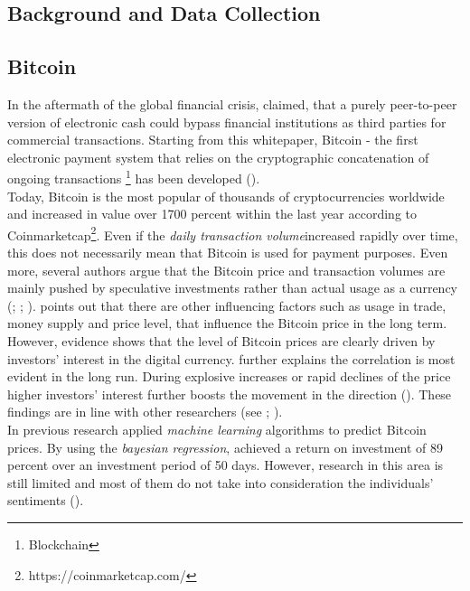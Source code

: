 \documentclass[a4paper,american,12pt]{article}
\begin{document}
\begin{spacing}{1.2}
\clearpage

\section{Background and Data Collection}
\label{sec:Background}
\subsection{Bitcoin}
In the aftermath of the global financial crisis, \textcite[p.~1]{Nakamoto2008Bitcoin} claimed, that a purely peer-to-peer version of electronic cash could bypass financial institutions as third parties for commercial transactions. Starting from this whitepaper, Bitcoin {-} the first electronic payment system that relies on the cryptographic concatenation of ongoing transactions \footnote{Blockchain} has been developed (\cite[p.~1]{Nakamoto2008Bitcoin}).\\

Today, Bitcoin is the most popular of thousands of cryptocurrencies worldwide and increased in value over 1700 percent within the last year according to Coinmarketcap\footnote{https://coinmarketcap.com/}. Even if the \textit{daily transaction volume}\footnotemark[2] increased rapidly over time, this does not necessarily mean that Bitcoin is used for payment purposes. Even more, several authors argue that the Bitcoin price and transaction volumes are mainly pushed by speculative investments rather than actual usage as a currency (\cite{corbet2017datestamping}; \cite{Forbes2017}; \cite{yermack2013bitcoin}). \textcite{kristoufek2015main} points out that there are other influencing factors such as usage in trade, money supply and price level, that influence the Bitcoin price in the long term. However, evidence shows that the level of Bitcoin prices are clearly driven by investors’ interest in the digital currency. \textcite{kristoufek2015main} further explains the correlation is most evident in the long run.  During explosive increases or rapid declines of the price higher investors’ interest further boosts the movement in the direction (\cite{kristoufek2015main}). These findings are in line with other researchers (see \cite[]{garcia2014digital}; \cite[]{kondor2014rich}).\\

In previous research \textcite{madan2015automated} applied \textit{machine learning} algorithms to predict Bitcoin prices. By using the \textit{bayesian regression}, \textcite{shah2014bayesian} achieved a return on investment of 89 percent over an investment period of 50 days. However, research in this area is still limited and most of them do not take into consideration the individuals' sentiments (\cite[p.~1]{colianni2015algorithmic}).\\


\end{spacing}
\end{document}
